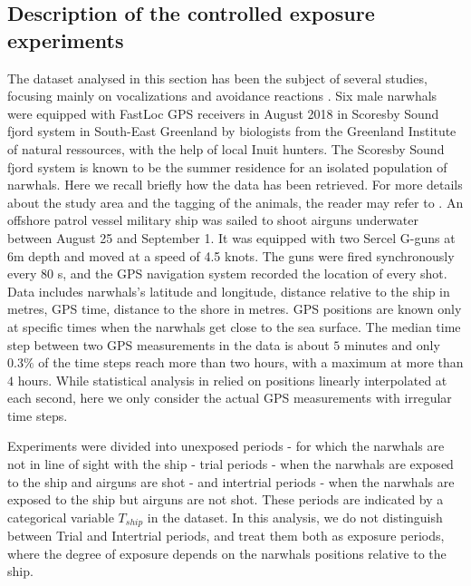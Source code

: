 \documentclass[11pt]{article}
\newcommand {\1}{\mathbb{1}}
\theoremstyle{definition}
\theoremstyle{remark}
\theoremstyle{remark}
\begin{document}
\subsection{Description of the controlled exposure experiments}

The dataset analysed in this section has been the subject of several studies, focusing mainly on vocalizations and avoidance reactions \cite{heide-jorgensen_behavioral_2021,tervo_narwhals_2021}. 
Six male narwhals were equipped with FastLoc GPS receivers in August 2018 in Scoresby Sound fjord system in South-East Greenland by biologists from the Greenland Institute of natural ressources, with the help of local Inuit hunters. The Scoresby Sound fjord system
is known to be the summer residence for an isolated population of narwhals.
Here we recall briefly how the data has been retrieved. For more details about the study area and the tagging of the animals, the reader may refer to \cite{heide-jorgensen_behavioral_2021}. 
An offshore patrol vessel military ship was sailed to shoot airguns underwater between August 25 and September 1. It was equipped with two Sercel G-guns at 6m depth and moved at a speed of 4.5 knots. The guns were fired synchronously every 80 s, and the GPS navigation system recorded the location of every shot. 
Data includes narwhals's latitude and longitude, distance relative to the ship in metres, GPS time, distance to the shore in metres. GPS positions are known only at specific times when the narwhals get close to the sea surface. The median time step between two GPS measurements in the data is about $5$ minutes and only $0.3 \%$ of the time steps reach more than two hours, with a maximum at more than $4$ hours. While statistical analysis in \cite{heide-jorgensen_behavioral_2021} relied on positions linearly interpolated at each second, here we only consider the actual GPS measurements with irregular time steps.



Experiments were divided into unexposed periods - for which the narwhals are not in line of sight with the ship - trial periods - when the narwhals are exposed to the ship and airguns are shot - and intertrial periods - when the narwhals are exposed to the ship but airguns are not shot. These periods are indicated by a categorical variable $T_{ship}$ in the dataset. In this analysis, we do not distinguish between Trial and Intertrial periods, and treat them both as exposure periods, where the degree of exposure depends on the narwhals positions relative to the ship.
\end{document}
